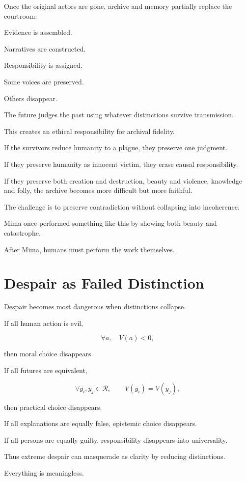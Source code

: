 \documentclass[11pt,oneside]{book}
\theoremstyle{definition}
\theoremstyle{remark}
\newcommand{\R}{\mathcal{R}}
\begin{document}
Once the original actors are gone, archive and memory partially replace the courtroom.

Evidence is assembled.

Narratives are constructed.

Responsibility is assigned.

Some voices are preserved.

Others disappear.

The future judges the past using whatever distinctions survive transmission.

This creates an ethical responsibility for archival fidelity.

If the survivors reduce humanity to a plague, they preserve one judgment.

If they preserve humanity as innocent victim, they erase causal responsibility.

If they preserve both creation and destruction, beauty and violence, knowledge and folly, the archive becomes more difficult but more faithful.

The challenge is to preserve contradiction without collapsing into incoherence.

Mima once performed something like this by showing both beauty and catastrophe.

After Mima, humans must perform the work themselves.

\section{Despair as Failed Distinction}

Despair becomes most dangerous when distinctions collapse.

If all human action is evil,

\[
\forall a,\quad V(a)<0,
\]

then moral choice disappears.

If all futures are equivalent,

\[
\forall y_i,y_j\in\R,
\qquad
V(y_i)=V(y_j),
\]

then practical choice disappears.

If all explanations are equally false, epistemic choice disappears.

If all persons are equally guilty, responsibility disappears into universality.

Thus extreme despair can masquerade as clarity by reducing distinctions.

Everything is meaningless.
\end{document}
